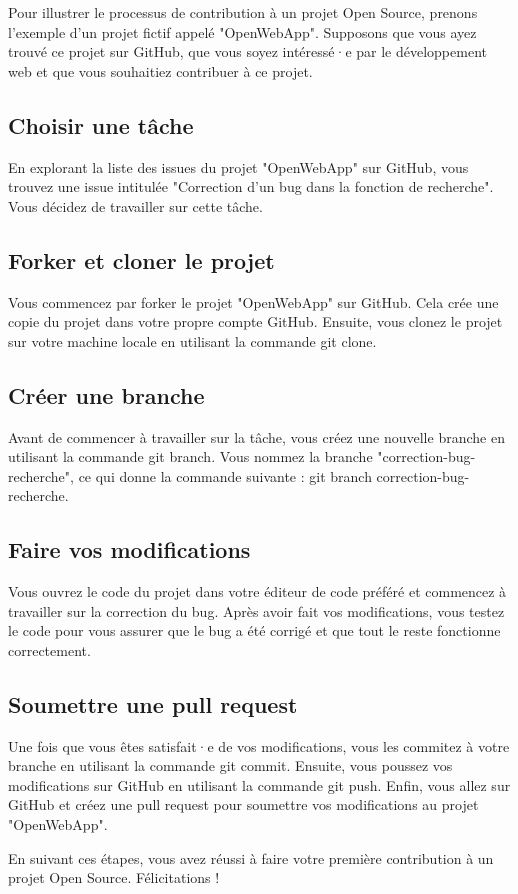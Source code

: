 Pour illustrer le processus de contribution à un projet Open Source, prenons l'exemple d'un projet fictif appelé "OpenWebApp". Supposons que vous ayez trouvé ce projet sur GitHub, que vous soyez intéressé·e par le développement web et que vous souhaitiez contribuer à ce projet.

\subsection{Choisir une tâche}

En explorant la liste des issues du projet "OpenWebApp" sur GitHub, vous trouvez une issue intitulée "Correction d'un bug dans la fonction de recherche". Vous décidez de travailler sur cette tâche.

\subsection{Forker et cloner le projet}

Vous commencez par forker le projet "OpenWebApp" sur GitHub. Cela crée une copie du projet dans votre propre compte GitHub. Ensuite, vous clonez le projet sur votre machine locale en utilisant la commande git clone.

\subsection{Créer une branche}

Avant de commencer à travailler sur la tâche, vous créez une nouvelle branche en utilisant la commande git branch. Vous nommez la branche "correction-bug-recherche", ce qui donne la commande suivante : git branch correction-bug-recherche.

\subsection{Faire vos modifications}

Vous ouvrez le code du projet dans votre éditeur de code préféré et commencez à travailler sur la correction du bug. Après avoir fait vos modifications, vous testez le code pour vous assurer que le bug a été corrigé et que tout le reste fonctionne correctement.

\subsection{Soumettre une pull request}

Une fois que vous êtes satisfait·e de vos modifications, vous les commitez à votre branche en utilisant la commande git commit. Ensuite, vous poussez vos modifications sur GitHub en utilisant la commande git push. Enfin, vous allez sur GitHub et créez une pull request pour soumettre vos modifications au projet "OpenWebApp".

En suivant ces étapes, vous avez réussi à faire votre première contribution à un projet Open Source. Félicitations !

